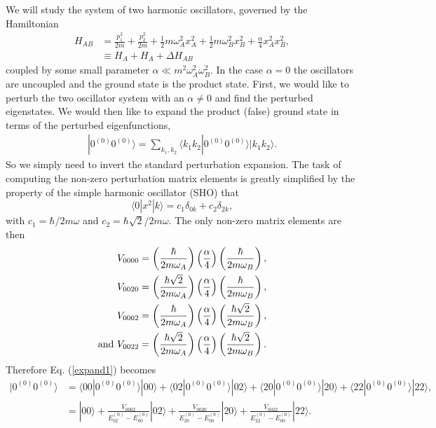 \documentclass[aps,showpacs,onecolumn,floats,prd,superscriptaddress,nofootinbib]{revtex4-1}
\begin{document}
We will study the system of two harmonic oscillators, governed by the Hamiltonian
\begin{align}
H_{AB} &= \frac{p^2_{1}}{2m} + \frac{p^2_{2}}{2m} + \frac{1}{2}m\omega_A^2x_A^2 + \frac{1}{2}m\omega_B^2x_B^2 + \frac{\alpha}{4} x_A^2x_B^2, \label{hamiltonian}
\\ &\equiv H_A + H_A + \Delta H_{AB}
\end{align}
coupled by some small parameter $\alpha \ll m^2\omega_A^2\omega_B^2$. In the case $\alpha = 0$ the oscillators are uncoupled and the ground state is the product state. First, we would like to perturb the two oscillator system with an $\alpha \neq 0$ and find the perturbed eigenstates. We would then like to expand the product (false) ground state in terms of the perturbed eigenfunctions,
\begin{align}
| 0^{(0)} 0^{(0)} \rangle = \sum_{k_1, k_2} \langle k_1 k_2 | 0^{(0)} 0^{(0)}\rangle | k_1 k_2 \rangle. \label{expand1}
\end{align} 
So we simply need to invert the standard perturbation expansion. The task of computing the non-zero perturbation matrix elements is greatly simplified by the property of the simple harmonic oscillator (SHO) that
\begin{equation}
\langle 0 | x^2 | k \rangle = c_1 \delta_{0k} + c_2 \delta_{2k},
\end{equation}
with $c_1 = \hbar / 2m\omega$ and $c_2 = \hbar \sqrt{2} / 2m\omega$. The only non-zero matrix elements are then
\begin{align}
V_{0000} &= \left( \frac{\hbar}{2m\omega_A}\right) \left( \frac{\alpha}{4}\right) \left( \frac{\hbar}{2m\omega_B}\right),
\\ V_{0020} &= \left( \frac{\hbar\sqrt{2}}{2m\omega_A}\right) \left( \frac{\alpha}{4}\right) \left( \frac{\hbar}{2m\omega_B}\right), 
\\ V_{0002} &= \left( \frac{\hbar}{2m\omega_A}\right) \left( \frac{\alpha}{4}\right) \left( \frac{\hbar\sqrt{2}}{2m\omega_B}\right), 
\\ {\rm and~} V_{0022} &= \left( \frac{\hbar\sqrt{2}}{2m\omega_A}\right) \left( \frac{\alpha}{4}\right) \left( \frac{\hbar\sqrt{2}}{2m\omega_B}\right).
\end{align}
Therefore Eq. (\ref{expand1}) becomes
\begin{align}
| 0^{(0)} 0^{(0)} \rangle &= \langle 00 | 0^{(0)} 0^{(0)}\rangle | 00 \rangle + \langle 02 | 0^{(0)} 0^{(0)}\rangle | 02 \rangle + \langle 20 | 0^{(0)} 0^{(0)}\rangle | 20 \rangle + \langle 22 | 0^{(0)} 0^{(0)}\rangle | 22 \rangle, \nonumber
\\ 
&= | 00 \rangle + \frac{V_{0002}}{E^{(0)}_{02} - E^{(0)}_{00}} | 02 \rangle + \frac{V_{0020}}{E^{(0)}_{20} - E^{(0)}_{00}}  | 20 \rangle + \frac{V_{0022}}{E^{(0)}_{22} - E^{(0)}_{00}} | 22 \rangle.
\label{expand2}
\end{align}
\end{document}
